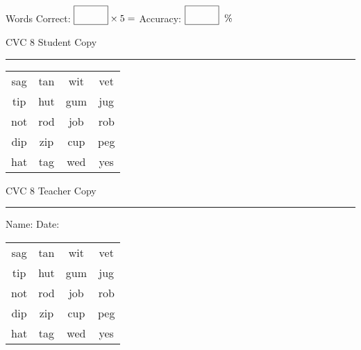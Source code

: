 \documentclass{memoir}
\begin{document}
\small

Words Correct: $\fbox{\phantom{\huge 100}} \times 5 = $ Accuracy: $\fbox{\phantom{\huge 100}}\;\; \%$ 

\vfill

\newpage


\footnotesize \noindent
CVC 8 \hfill Student Copy
\smallskip
\hrule

\Large

\setlength{\tabcolsep}{14pt}
\def\arraystretch{2}

{\selectfont


\begin{vplace}[0.5]
\begin{center}
\begin{tabular}{cccc}
sag & tan & wit & vet \\
tip & hut & gum  & jug \\
not & rod & job & rob \\
dip & zip & cup & peg \\
hat & tag & wed & yes \\
\end{tabular}
\end{center}
\end{vplace}

}

\newpage

\footnotesize \noindent
CVC 8 \hfill Teacher Copy
\smallskip
\hrule

\small

\vfill

\noindent
Name: \underline{\hspace{1.75in}} \hfill Date: \underline{\hspace{1in}}

\Large

{\selectfont


\begin{vplace}[0.5]
\begin{center}
\begin{tabular}{cccc}
sag & tan & wit & vet \\
tip & hut & gum  & jug \\
not & rod & job & rob \\
dip & zip & cup & peg \\
hat & tag & wed & yes \\
\end{tabular}
\end{center}
\end{vplace}



}
\end{document}
